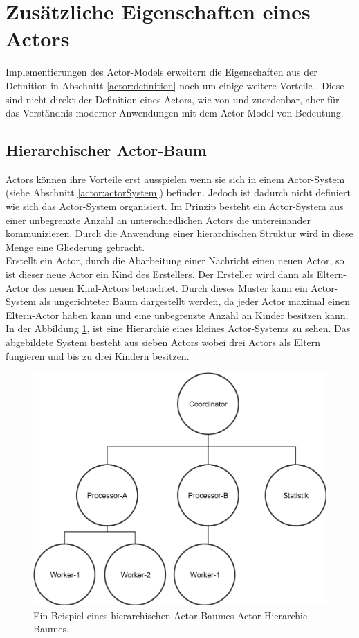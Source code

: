 \section{Zusätzliche Eigenschaften eines Actors}
Implementierungen des Actor-Models erweitern die Eigenschaften aus der Definition in Abschnitt \ref{actor:definition} noch um einige weitere Vorteile \citep{Vernon2015ReactiveAkka}. Diese sind nicht direkt der Definition eines Actors, wie von \cite{Hewitt1973AIntelligence} und \cite{Agha1985ActorsSystems} zuordenbar, aber für das Verständnis moderner Anwendungen mit dem Actor-Model von Bedeutung.
\subsection{Hierarchischer Actor-Baum}
Actors können ihre Vorteile erst ausspielen wenn sie sich in einem Actor-System (siehe Abschnitt \ref{actor:actorSystem}) befinden. Jedoch ist dadurch nicht definiert wie sich das Actor-System organisiert. Im Prinzip besteht ein Actor-System aus einer unbegrenzte Anzahl an unterschiedlichen Actors die untereinander kommunizieren. Durch die Anwendung einer hierarchischen Struktur wird in diese Menge eine Gliederung gebracht. \\
Erstellt ein Actor, durch die Abarbeitung einer Nachricht einen neuen Actor, so ist dieser neue Actor ein Kind des Erstellers. Der Ersteller wird dann als Eltern-Actor des neuen Kind-Actors betrachtet. Durch dieses Muster kann ein Actor-System als ungerichteter Baum dargestellt werden, da jeder Actor maximal einen Eltern-Actor haben kann und eine unbegrenzte Anzahl an Kinder besitzen kann. \\
In der Abbildung \ref{fig:actor:actorHierarchySample}, ist eine Hierarchie eines kleines Actor-Systems zu sehen. Das abgebildete System besteht aus sieben Actors wobei drei Actors als Eltern fungieren und bis zu drei Kindern besitzen. 
\begin{figure}
  \centering
  \includegraphics[width=0.6\linewidth]{gfx/actor/actorHierarchy}
  \caption{Ein Beispiel eines hierarchischen Actor-Baumes Actor-Hierarchie-Baumes.}
  \label{fig:actor:actorHierarchySample}
\end{figure}

